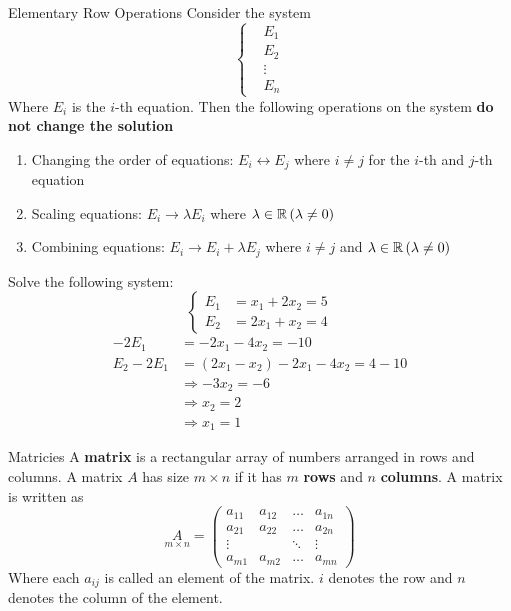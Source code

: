 \begin{impbox}{Elementary Row Operations}
    Consider the system 
    \[\begin{cases}
        &E_1 \\
        &E_2 \\
        &\vdots \\
        &E_n
    \end{cases}\]
    Where $E_i$ is the $i$-th equation. Then the following operations on the system \textbf{do not change the solution}
    \begin{enumerate}
        \item Changing the order of equations: $E_i \leftrightarrow E_j$ where $i \ne j$ for the $i$-th and $j$-th equation
        \item Scaling equations: $E_i \rightarrow \lambda E_i$ where $\lambda\in\mathbb R\left(\lambda \ne 0\right)$
        \item Combining equations: $E_i \rightarrow E_i + \lambda E_j$ where $i \ne j$ and $\lambda \in \mathbb R \left(\lambda \ne 0\right)$
    \end{enumerate}
\end{impbox}

\begin{example}{}{}
    Solve the following system:
    \[\begin{cases}
        E_1 &= x_1 + 2x_2 = 5 \\
        E_2 &= 2x_1 + x_2 = 4
    \end{cases}\]
    \begin{align*}
        -2E_1 &= -2x_1 - 4x_2 = -10 \\
        E_2 - 2E_1 &= (2x_1 - x_2) - 2x_1 - 4x_2 = 4-10 \\
        &\Rightarrow -3x_2 = -6 \\
        &\Rightarrow x_2 = 2 \\
        &\Rightarrow x_1 = 1
    \end{align*}
\end{example}

\begin{defbox}{Matricies}
    A \textbf{matrix} is a rectangular array of numbers arranged in rows and columns. A matrix $A$ has size $m \times n$ if it has $m$ \textbf{rows} and $n$ \textbf{columns}. A matrix is written as
    \[\underset{m \times n}{A} = \begin{pmatrix}
    a_{11} & a_{12} & \dots & a_{1n} \\
    a_{21} & a_{22} & \dots & a_{2n} \\
    \vdots & & \ddots & \vdots \\
    a_{m1} & a_{m2} & \dots & a_{mn}
    \end{pmatrix}\]
    Where each $a_{ij}$ is called an element of the matrix. $i$ denotes the row and $n$ denotes the column of the element.
\end{defbox}

